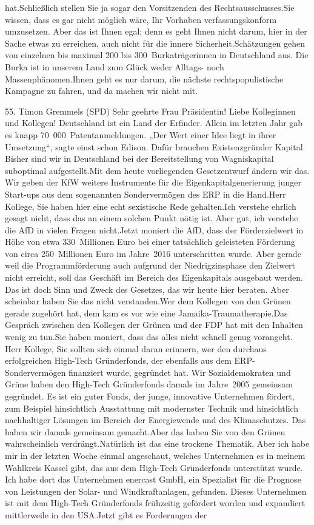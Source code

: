 \documentclass{article}
\begin{document}
hat.Schließlich stellen Sie ja sogar den Vorsitzenden des Rechtsausschusses.Sie wissen, dass es gar nicht möglich wäre, Ihr Vorhaben verfassungskonform umzusetzen. Aber das ist Ihnen egal; denn es geht Ihnen nicht darum, hier in der Sache etwas zu erreichen, auch nicht für die innere Sicherheit.Schätzungen gehen von einzelnen bis maximal 200 bis 300 Burkaträgerinnen in Deutschland aus. Die Burka ist in unserem Land zum Glück weder Alltags- noch Massenphänomen.Ihnen geht es nur darum, die nächste rechtspopulistische Kampagne zu fahren, und da machen wir nicht mit.




	55. Timon Gremmels (SPD) Sehr geehrte Frau Präsidentin! Liebe Kolleginnen und Kollegen! Deutschland ist ein Land der Erfinder. Allein im letzten Jahr gab es knapp 70 000 Patentanmeldungen. „Der Wert einer Idee liegt in ihrer Umsetzung“, sagte einst schon Edison. Dafür brauchen Existenzgründer Kapital. Bisher sind wir in Deutschland bei der Bereitstellung von Wagniskapital suboptimal aufgestellt.Mit dem heute vorliegenden Gesetzentwurf ändern wir das. Wir geben der KfW weitere Instrumente für die Eigenkapitalgenerierung junger Start-ups aus dem sogenannten Sondervermögen des ERP in die Hand.Herr Kollege, Sie haben hier eine echt sexistische Rede gehalten.Ich verstehe ehrlich gesagt nicht, dass das an einem solchen Punkt nötig ist. Aber gut, ich verstehe die AfD in vielen Fragen nicht.Jetzt moniert die AfD, dass der Förderzielwert in Höhe von etwa 330 Millionen Euro bei einer tatsächlich geleisteten Förderung von circa 250 Millionen Euro im Jahre 2016 unterschritten wurde. Aber gerade weil die Programmförderung auch aufgrund der Niedrigzinsphase den Zielwert nicht erreicht, soll das Geschäft im Bereich des Eigenkapitals ausgebaut werden. Das ist doch Sinn und Zweck des Gesetzes, das wir heute hier beraten. Aber scheinbar haben Sie das nicht verstanden.Wer dem Kollegen von den Grünen gerade zugehört hat, dem kam es vor wie eine Jamaika-Traumatherapie.Das Gespräch zwischen den Kollegen der Grünen und der FDP hat mit den Inhalten wenig zu tun.Sie haben moniert, dass das alles nicht schnell genug vorangeht. Herr Kollege, Sie sollten sich einmal daran erinnern, wer den durchaus erfolgreichen High-Tech Gründerfonds, der ebenfalls aus dem ERP-Sondervermögen finanziert wurde, gegründet hat. Wir Sozialdemokraten und Grüne haben den High-Tech Gründerfonds damals im Jahre 2005 gemeinsam gegründet. Es ist ein guter Fonds, der junge, innovative Unternehmen fördert, zum Beispiel hinsichtlich Ausstattung mit modernster Technik und hinsichtlich nachhaltiger Lösungen im Bereich der Energiewende und des Klimaschutzes. Das haben wir damals gemeinsam gemacht.Aber das haben Sie von den Grünen wahrscheinlich verdrängt.Natürlich ist das eine trockene Thematik. Aber ich habe mir in der letzten Woche einmal angeschaut, welches Unternehmen es in meinem Wahlkreis Kassel gibt, das aus dem High-Tech Gründerfonds unterstützt wurde. Ich habe dort das Unternehmen enercast GmbH, ein Spezialist für die Prognose von Leistungen der Solar- und Windkraftanlagen, gefunden. Dieses Unternehmen ist mit dem High-Tech Gründerfonds frühzeitig gefördert worden und expandiert mittlerweile in den USA.Jetzt gibt es Forderungen der 
\end{document}
